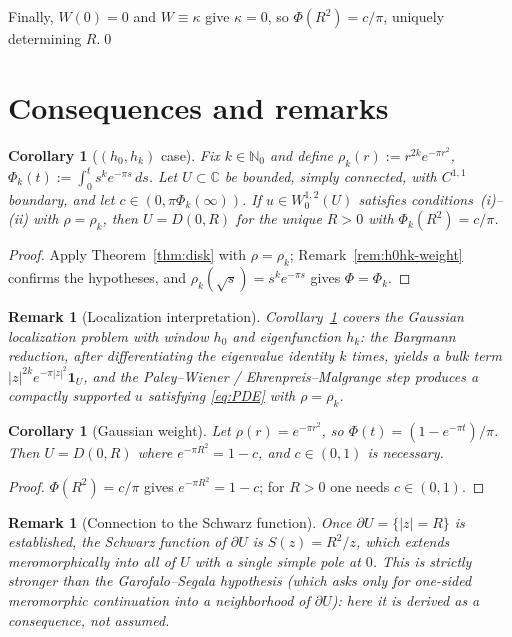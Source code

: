 \documentclass[11pt]{article}
\newtheorem{corollary}[theorem]{Corollary}
\newtheorem{remark}[theorem]{Remark}
\newcommand{\C}{\mathbb{C}}
\newcommand{\1}{\mathbf{1}}
\begin{document}
Finally, $W(0)=0$ and $W\equiv\kappa$ give $\kappa=0$, so $\Phi(R^2)=c/\pi$, uniquely
determining $R$.\qed

\section{Consequences and remarks}

\begin{corollary}[\((h_0,h_k)\) case]\label{cor:h0hk}
  Fix $k\in\mathbb N_0$ and define $\rho_k(r):=r^{2k}e^{-\pi r^2}$,
  $\Phi_k(t):=\int_0^t s^ke^{-\pi s}\,ds$.  Let $U\subset\C$ be bounded, simply connected,
  with $C^{1,1}$ boundary, and let $c\in(0,\pi\Phi_k(\infty))$.  If $u\in W^{1,2}_0(U)$
  satisfies conditions~(i)--(ii) with $\rho=\rho_k$, then $U=D(0,R)$ for the unique
  $R>0$ with $\Phi_k(R^2)=c/\pi$.
\end{corollary}

\begin{proof}
  Apply Theorem~\ref{thm:disk} with $\rho=\rho_k$; Remark~\ref{rem:h0hk-weight} confirms the
  hypotheses, and $\rho_k(\sqrt{s})=s^ke^{-\pi s}$ gives $\Phi=\Phi_k$.
\end{proof}

\begin{remark}[Localization interpretation]\label{rem:localization-h0hk}
  Corollary~\ref{cor:h0hk} covers the Gaussian localization problem with window $h_0$ and
  eigenfunction $h_k$: the Bargmann reduction, after differentiating the eigenvalue identity
  $k$ times, yields a bulk term $|z|^{2k}e^{-\pi|z|^2}\1_U$, and the
  Paley--Wiener / Ehrenpreis--Malgrange step produces a compactly supported $u$ satisfying
  \eqref{eq:PDE} with $\rho=\rho_k$.
\end{remark}

\begin{corollary}[Gaussian weight]\label{cor:gaussian}
  Let $\rho(r)=e^{-\pi r^2}$, so $\Phi(t)=(1-e^{-\pi t})/\pi$.  Then $U=D(0,R)$ where
  $e^{-\pi R^2}=1-c$, and $c\in(0,1)$ is necessary.
\end{corollary}

\begin{proof}
  $\Phi(R^2)=c/\pi$ gives $e^{-\pi R^2}=1-c$; for $R>0$ one needs $c\in(0,1)$.
\end{proof}

\begin{remark}[Connection to the Schwarz function]
  Once $\partial U=\{|z|=R\}$ is established, the Schwarz function of $\partial U$ is
  $S(z)=R^2/z$, which extends meromorphically into all of $U$ with a single simple pole at $0$.
  This is strictly stronger than the Garofalo--Segala hypothesis (which asks only for
  one-sided meromorphic continuation into a neighborhood of $\partial U$): here it is derived
  as a consequence, not assumed.
\end{remark}
\end{document}
